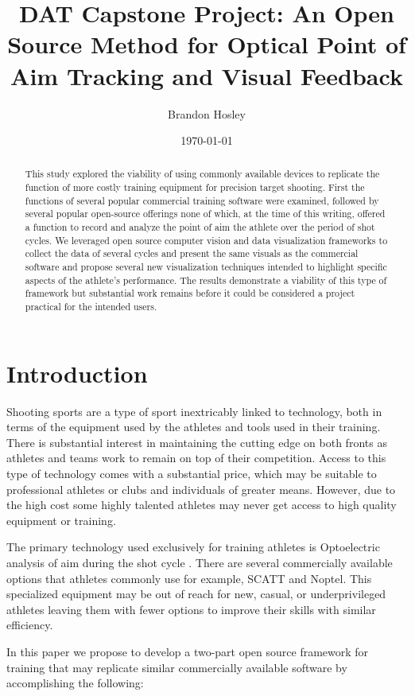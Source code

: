 \documentclass[conference]{IEEEtran}
\title{DAT Capstone Project: An Open Source Method for Optical Point of Aim Tracking and Visual Feedback}
\author{Brandon Hosley}
\date{\today}
\begin{document}
	\maketitle
	
\begin{abstract}
This study explored the viability of using commonly available devices to replicate the function of more costly training equipment for precision target shooting.
First the functions of several popular commercial training software were examined,
followed by several popular open-source offerings none of which, at the time of this writing, offered a function to record and analyze the point of aim the athlete over the period of shot cycles.
We leveraged open source computer vision and data visualization frameworks to collect the data of several cycles and present the same visuals as the commercial software and propose several new visualization techniques intended to highlight specific aspects of the athlete's performance.
The results demonstrate a viability of this type of framework but substantial work remains before it could be considered a project practical for the intended users.
\end{abstract}

\section{Introduction}

Shooting sports are a type of sport inextricably linked to technology, 
both in terms of the equipment used by the athletes and tools used in their training.
There is substantial interest in maintaining the cutting edge on both fronts as athletes and teams work to remain on top of their competition.
Access to this type of technology comes with a substantial price, which may be suitable to professional athletes or clubs and individuals of greater means.
However, due to the high cost some highly talented athletes may never get access to high quality equipment or training.

The primary technology used exclusively for training athletes is Optoelectric analysis of aim during the shot cycle \cite{Mononen2003, Simo2018}.
There are several commercially available options that athletes commonly use for example, SCATT \cite{scatt} and Noptel\cite{noptel}.
This specialized equipment may be out of reach for new, casual, or underprivileged athletes leaving them with fewer options to improve their skills with similar efficiency.

In this paper we propose to develop a two-part open source framework for training that may replicate similar commercially available software by accomplishing the following:
\end{document}
